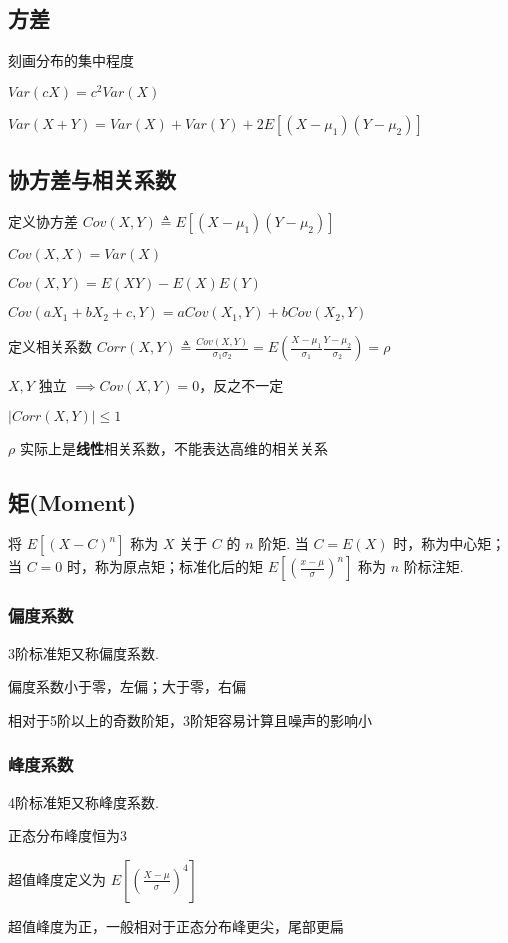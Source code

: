 \documentclass[./main.tex]{subfiles}
\begin{document}
\subsection{方差}
\begin{enumerate*}
    \item 刻画分布的集中程度
    \item $Var(cX)=c^2Var(X)$
    \item $Var(X+Y)=Var(X)+Var(Y)+2E[(X-\mu_1)(Y-\mu_2)]$
\end{enumerate*}
\subsection{协方差与相关系数}
\noindent 定义协方差 $Cov(X,Y)\triangleq E[(X-\mu_1)(Y-\mu_2)]$
\begin{enumerate*}
    \item $Cov(X,X)=Var(X)$
    \item $Cov(X,Y)=E(XY)-E(X)E(Y)$
    \item $Cov(aX_1+bX_2+c,Y)=aCov(X_1,Y)+bCov(X_2,Y)$
\end{enumerate*}
定义相关系数 $Corr(X,Y)\triangleq \frac{Cov(X,Y)}{\sigma_1\sigma_2}=E(\frac{X-\mu_1}{\sigma_1}\frac{Y-\mu_2}{\sigma_2})=\rho$
\begin{enumerate*}
    \item $X,Y$ 独立 $\implies Cov(X,Y)=0$，反之不一定
    \item $|Corr(X,Y)|\le 1$
    \item $\rho$ 实际上是\textbf{线性}相关系数，不能表达高维的相关关系
\end{enumerate*}
\subsection{矩(Moment)}
将 $E[(X-C)^n]$ 称为 $X$ 关于 $C$ 的 $n$ 阶矩. 当 $C=E(X)$ 时，称为中心矩；当 $C=0$ 时，称为原点矩；标准化后的矩 $E[\left(\frac{x-\mu}{\sigma}\right)^n]$ 称为 $n$ 阶标注矩. 
\subsubsection{偏度系数}
3阶标准矩又称偏度系数. 
\begin{enumerate*}
    \item 偏度系数小于零，左偏；大于零，右偏
    \item 相对于5阶以上的奇数阶矩，3阶矩容易计算且噪声的影响小
\end{enumerate*}
\subsubsection{峰度系数}
4阶标准矩又称峰度系数. 
\begin{enumerate*}
    \item 正态分布峰度恒为3
    \item 超值峰度定义为 $E[\left(\frac{X-\mu}{\sigma}\right)^4]$
    \item 超值峰度为正，一般相对于正态分布峰更尖，尾部更扁
\end{enumerate*}
\end{document}
